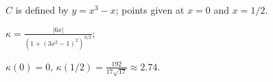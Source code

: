 {$C$ is defined by $y = x^3-x$; points given at $x=0$ and $x=1/2$. 
}
{$\kappa = \frac{|6x|}{\left(1+(3x^2-1)^2\right)^{3/2}}$;

$\kappa(0) = 0$, $\kappa(1/2) = \frac{192}{17\sqrt{17}} \approx 2.74$.
}